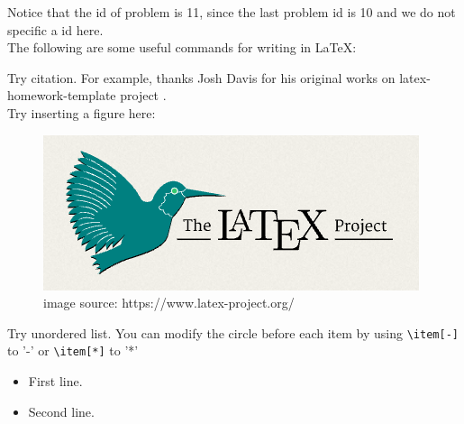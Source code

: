 \documentclass[UTF8]{homework}
\begin{document}
%
%
\begin{homeworkProblem}

    Notice that the id of problem is 11, since the last problem id is 10 and we do not specific a id here. \\

    The following are some useful commands for writing in \LaTeX:

    \solution

    Try citation. For example, thanks Josh Davis for his original works on latex-homework-template project \cite{LatexHomeworkTemplate}. \\

    Try inserting a figure here: 

    \begin{figure}[h]
        \centering
        \includegraphics[scale=0.6]{figures/example.png}
        \caption{image source: https://www.latex-project.org/}
    \end{figure}

    Try unordered list. You can modify the circle before each item by using \verb|\item[-]| to '-' or \verb|\item[*]| to '*'
    
    \begin{itemize}
        \item First line.
        \item Second line.
    \end{itemize}


\end{homeworkProblem}
\end{document}
